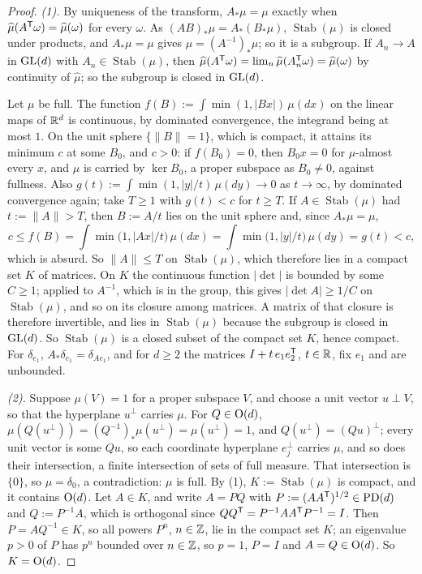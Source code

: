\begin{proof}
\leanok
\emph{(1).} By uniqueness of the transform, $A_*\mu = \mu$ exactly when
$\widehat\mu(A^{\mathsf{T}}\omega) = \widehat\mu(\omega)$ for every $\omega$. As $(AB)_*\mu = A_*(B_*\mu)$,
$\operatorname{Stab}(\mu)$ is closed under products, and $A_*\mu = \mu$ gives
$\mu = (A^{-1})_*\mu$; so it is a subgroup. If $A_n \to A$ in $\mathrm{GL}(d)$ with
$A_n \in \operatorname{Stab}(\mu)$, then $\widehat\mu(A^{\mathsf{T}}\omega) = \lim_n\widehat\mu(A_n^{\mathsf{T}}\omega)
= \widehat\mu(\omega)$ by continuity of $\widehat\mu$; so the subgroup is closed in $\mathrm{GL}(d)$.

Let $\mu$ be full. The function $f(B) := \int\min(1, |Bx|)\,\mu(dx)$ on the linear maps of $\mathbb{R}^d$
is continuous, by dominated convergence, the integrand being at most $1$. On the unit sphere
$\{\|B\| = 1\}$, which is compact, it attains its minimum $c$ at some $B_0$, and $c > 0$: if
$f(B_0) = 0$, then $B_0x = 0$ for $\mu$-almost every $x$, and $\mu$ is carried by $\ker B_0$, a
proper subspace as $B_0 \ne 0$, against fullness. Also
$g(t) := \int\min(1, |y|/t)\,\mu(dy) \to 0$ as $t \to \infty$, by dominated convergence again; take
$T \ge 1$ with $g(t) < c$ for $t \ge T$. If $A \in \operatorname{Stab}(\mu)$ had $t := \|A\| > T$, then
$B := A/t$ lies on the unit sphere and, since $A_*\mu = \mu$,
\[
  c \le f(B) = \int\min\bigl(1, |Ax|/t\bigr)\,\mu(dx) = \int\min\bigl(1, |y|/t\bigr)\,\mu(dy) = g(t) < c,
\]
which is absurd. So $\|A\| \le T$ on $\operatorname{Stab}(\mu)$, which therefore lies in a compact
set $K$ of matrices. On $K$ the continuous function $|\det|$ is bounded by some $C \ge 1$; applied
to $A^{-1}$, which is in the group, this gives $|\det A| \ge 1/C$ on $\operatorname{Stab}(\mu)$, and
so on its closure among matrices. A matrix of that closure is therefore invertible, and lies in
$\operatorname{Stab}(\mu)$ because the subgroup is closed in $\mathrm{GL}(d)$. So $\operatorname{Stab}(\mu)$
is a closed subset of the compact set $K$, hence compact. For $\delta_{e_1}$,
$A_*\delta_{e_1} = \delta_{Ae_1}$, and for $d \ge 2$ the matrices $I + t\,e_1e_2^{\mathsf{T}}$, $t \in \mathbb{R}$,
fix $e_1$ and are unbounded.

\emph{(2).} Suppose $\mu(V) = 1$ for a proper subspace $V$, and choose a unit vector $u \perp V$, so
that the hyperplane $u^\perp$ carries $\mu$. For $Q \in \mathrm{O}(d)$,
$\mu(Q(u^\perp)) = (Q^{-1})_*\mu(u^\perp) = \mu(u^\perp) = 1$, and $Q(u^\perp) = (Qu)^\perp$; every unit
vector is some $Qu$, so each coordinate hyperplane $e_j^\perp$ carries $\mu$, and so does their
intersection, a finite intersection of sets of full measure. That intersection is $\{0\}$, so
$\mu = \delta_0$, a contradiction: $\mu$ is full. By (1), $K := \operatorname{Stab}(\mu)$ is compact,
and it contains $\mathrm{O}(d)$. Let $A \in K$, and write $A = PQ$ with $P := (AA^{\mathsf{T}})^{1/2} \in \mathrm{PD}(d)$
and $Q := P^{-1}A$, which is orthogonal since $QQ^{\mathsf{T}} = P^{-1}AA^{\mathsf{T}}P^{-1} = I$. Then
$P = AQ^{-1} \in K$, so all powers $P^n$, $n \in \mathbb{Z}$, lie in the compact set $K$; an eigenvalue
$p > 0$ of $P$ has $p^n$ bounded over $n \in \mathbb{Z}$, so $p = 1$, $P = I$ and $A = Q \in \mathrm{O}(d)$. So
$K = \mathrm{O}(d)$.


\end{proof}
